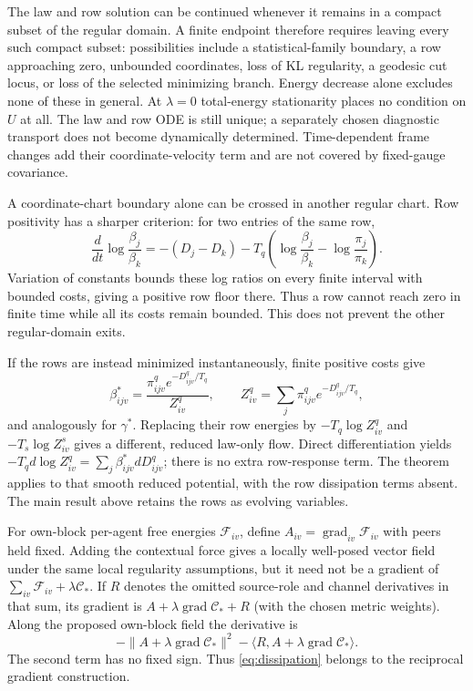 \documentclass[11pt]{article}
\DeclareMathOperator{\grad}{grad}
\begin{document}
The law and row solution can be continued whenever it remains in a compact subset of the regular domain. A finite endpoint therefore requires leaving every such compact subset: possibilities include a statistical-family boundary, a row approaching zero, unbounded coordinates, loss of KL regularity, a geodesic cut locus, or loss of the selected minimizing branch. Energy decrease alone excludes none of these in general. At $\lambda=0$ total-energy stationarity places no condition on $U$ at all. The law and row ODE is still unique; a separately chosen diagnostic transport does not become dynamically determined. Time-dependent frame changes add their coordinate-velocity term and are not covered by fixed-gauge covariance.

A coordinate-chart boundary alone can be crossed in another regular chart. Row positivity has a sharper criterion: for two entries of the same row,
\begin{equation}
 \frac{d}{dt}\log\frac{\beta_j}{\beta_k}
 =-(D_j-D_k)-T_q\left(\log\frac{\beta_j}{\beta_k}
                           -\log\frac{\pi_j}{\pi_k}\right).
\end{equation}
Variation of constants bounds these log ratios on every finite interval with bounded costs, giving a positive row floor there. Thus a row cannot reach zero in finite time while all its costs remain bounded. This does not prevent the other regular-domain exits.

If the rows are instead minimized instantaneously, finite positive costs give
\begin{equation}
 \beta^*_{ijv}=\frac{\pi^q_{ijv}e^{-D^q_{ijv}/T_q}}{Z^q_{iv}},\qquad
 Z^q_{iv}=\sum_j\pi^q_{ijv}e^{-D^q_{ijv}/T_q},
\end{equation}
and analogously for $\gamma^*$. Replacing their row energies by $-T_q\log Z^q_{iv}$ and $-T_s\log Z^s_{iv}$ gives a different, reduced law-only flow. Direct differentiation yields $-T_qd\log Z^q_{iv}=\sum_j\beta^*_{ijv}dD^q_{ijv}$; there is no extra row-response term. The theorem applies to that smooth reduced potential, with the row dissipation terms absent. The main result above retains the rows as evolving variables.

For own-block per-agent free energies $\mathcal F_{iv}$, define $A_{iv}=\grad_{iv}\mathcal F_{iv}$ with peers held fixed. Adding the contextual force gives a locally well-posed vector field under the same local regularity assumptions, but it need not be a gradient of $\sum_{iv}\mathcal F_{iv}+\lambda\mathcal C_*$. If $R$ denotes the omitted source-role and channel derivatives in that sum, its gradient is $A+\lambda\grad\mathcal C_*+R$ (with the chosen metric weights). Along the proposed own-block field the derivative is
\begin{equation}
 -\|A+\lambda\grad\mathcal C_*\|^2
 -\langle R,A+\lambda\grad\mathcal C_*\rangle.
\end{equation}
The second term has no fixed sign. Thus \eqref{eq:dissipation} belongs to the reciprocal gradient construction.
\end{document}

